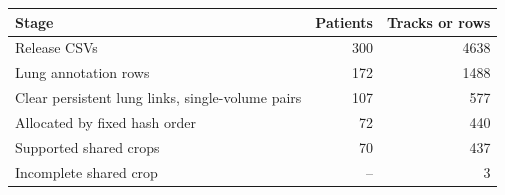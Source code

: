 \begin{tabular}{lrr}
\toprule
Stage & Patients & Tracks or rows \\
\midrule
Release CSVs & 300 & 4638 \\
Lung annotation rows & 172 & 1488 \\
Clear persistent lung links, single-volume pairs & 107 & 577 \\
Allocated by fixed hash order & 72 & 440 \\
Supported shared crops & 70 & 437 \\
Incomplete shared crop & -- & 3 \\
\bottomrule
\end{tabular}
